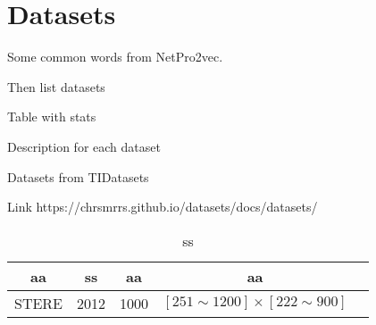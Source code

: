 \section{Datasets}
\label{sec:datasets}


Some common words from NetPro2vec.

Then list datasets

Table with stats

Description for each dataset

Datasets from TIDatasets \cite{TUDataset}

Link https://chrsmrrs.github.io/datasets/docs/datasets/


\begin{center}
    \begin{table}
        \begin{tabular}{|c|c|c|c|c|}
            \hline
            aa & ss & aa & aa\\
            \hline
            \hline
            STERE & 2012 & 1000 & $[251 \sim 1200] \times [222 \sim 900]$ \\
            \hline

            \hline
        \end{tabular}
    \caption{ss}
    \label{tab:datasets}
    \end{table}
\end{center}

